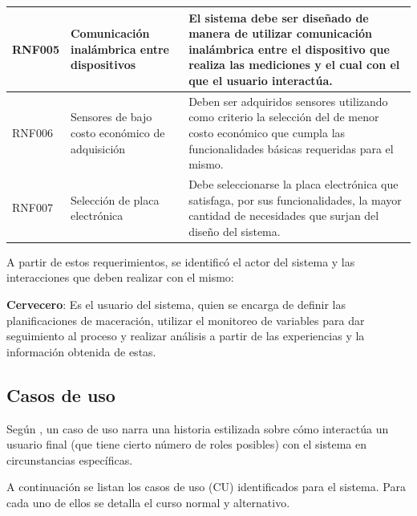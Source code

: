 \begin{longtable}{|p{1.4cm}|p{3.1cm}|p{9.5cm}|}
    RNF005 & Comunicación inalámbrica entre dispositivos & El sistema debe ser diseñado de manera de utilizar comunicación inalámbrica entre el dispositivo que realiza las mediciones y el cual con el que el usuario interactúa.
    \\ \hline
    
    RNF006 & Sensores de bajo costo económico de adquisición & Deben ser adquiridos sensores utilizando como criterio la selección del de menor costo económico que cumpla las funcionalidades básicas requeridas para el mismo.
    \\ \hline
    
    RNF007 & Selección de placa electrónica & Debe seleccionarse la placa electrónica que satisfaga, por sus funcionalidades, la mayor cantidad de necesidades que surjan del diseño del sistema.
    \\ \hline
 \end{longtable}
 
    \par
    A partir de estos requerimientos, se identificó el actor del sistema y las
    interacciones que deben realizar con el mismo:
    \par
    \textbf{Cervecero}: Es el usuario del sistema, quien se encarga de definir las planificaciones de maceración, utilizar el monitoreo de variables para dar seguimiento al proceso y realizar análisis a partir de las experiencias y la información obtenida de estas.
 
    
    \subsection{Casos de uso}
    Según \cite{Press10}, un caso de uso narra una historia estilizada sobre cómo interactúa un usuario final (que tiene cierto número de roles posibles) con el sistema en circunstancias específicas.
    \par
    A continuación se listan los casos de uso (CU) identificados para el sistema. Para cada uno de ellos se detalla el curso normal y alternativo.
    
